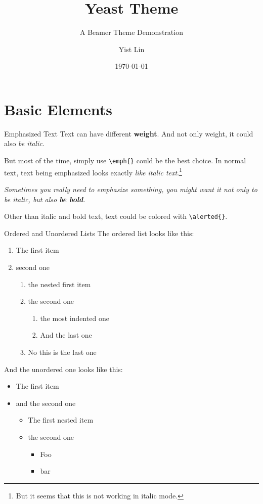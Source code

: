 \documentclass[10pt]{beamer}
\title{Yeast Theme}
\subtitle{A Beamer Theme Demonstration}
\author{Yist Lin}
\date{\today}
\begin{document}
\maketitle

\maketoc

\section{Basic Elements}

\begin{frame}{Emphasized Text}
  Text can have different \textbf{weight}.
  And not only weight, it could also \textit{be italic}.

  But most of the time, simply use \texttt{\textbackslash{}emph\{\}} could be the best choice.
  In normal text, text being emphasized looks exactly \emph{like italic text}.\footnote{But it seems that this is not working in italic mode.}

  \textit{Sometimes you really need to emphasize something, you might want it not only to be italic, but also \textbf{be bold}.}

  Other than italic and bold text, text could \alert{be colored} with \texttt{\textbackslash{}alerted\{\}}.
\end{frame}

\begin{frame}{Ordered and Unordered Lists}
  The ordered list looks like this:
  \begin{enumerate}
    \item The first item
    \item second one
          \begin{enumerate}
            \item the nested first item
            \item the second one
                  \begin{enumerate}
                    \item the most indented one
                    \item And the last one
                  \end{enumerate}
            \item No this is the last one
          \end{enumerate}
  \end{enumerate}

  And the unordered one looks like this:
  \begin{itemize}
    \item The first item
    \item and the second one
          \begin{itemize}
            \item The first nested item
            \item the second one
                  \begin{itemize}
                    \item Foo
                    \item bar
                  \end{itemize}
          \end{itemize}
  \end{itemize}
\end{frame}
\end{document}
